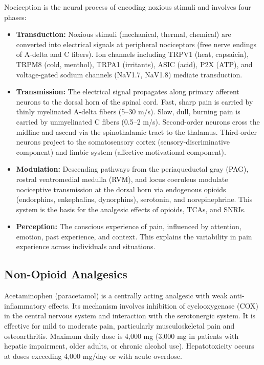 Nociception is the neural process of encoding noxious stimuli and involves four phases:
\begin{itemize}[noitemsep]
  \item \textbf{Transduction:} Noxious stimuli (mechanical, thermal, chemical) are converted into electrical signals at peripheral nociceptors (free nerve endings of A-delta and C fibers). Ion channels including TRPV1 (heat, capsaicin), TRPM8 (cold, menthol), TRPA1 (irritants), ASIC (acid), P2X (ATP), and voltage-gated sodium channels (NaV1.7, NaV1.8) mediate transduction.
  \item \textbf{Transmission:} The electrical signal propagates along primary afferent neurons to the dorsal horn of the spinal cord. Fast, sharp pain is carried by thinly myelinated A-delta fibers (5--30 m/s). Slow, dull, burning pain is carried by unmyelinated C fibers (0.5--2 m/s). Second-order neurons cross the midline and ascend via the spinothalamic tract to the thalamus. Third-order neurons project to the somatosensory cortex (sensory-discriminative component) and limbic system (affective-motivational component).
  \item \textbf{Modulation:} Descending pathways from the periaqueductal gray (PAG), rostral ventromedial medulla (RVM), and locus coeruleus modulate nociceptive transmission at the dorsal horn via endogenous opioids (endorphins, enkephalins, dynorphins), serotonin, and norepinephrine. This system is the basis for the analgesic effects of opioids, TCAs, and SNRIs.
  \item \textbf{Perception:} The conscious experience of pain, influenced by attention, emotion, past experience, and context. This explains the variability in pain experience across individuals and situations.
\end{itemize}

\subsection{Non-Opioid Analgesics}
\label{sec:Non-Opioid Analgesics}

Acetaminophen (paracetamol) is a centrally acting analgesic with weak anti-inflammatory effects. Its mechanism involves inhibition of cyclooxygenase (COX) in the central nervous system and interaction with the serotonergic system. It is effective for mild to moderate pain, particularly musculoskeletal pain and osteoarthritis. Maximum daily dose is 4,000 mg (3,000 mg in patients with hepatic impairment, older adults, or chronic alcohol use). Hepatotoxicity occurs at doses exceeding 4,000 mg/day or with acute overdose.

